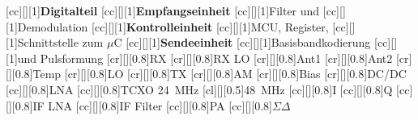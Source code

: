 [cc][][1]{\Large\textbf{Digitalteil}}
[cc][][1]{\textbf{Empfangseinheit}}
[cc][][1]{Filter und}
[cc][][1]{Demodulation}
[cc][][1]{\textbf{Kontrolleinheit}}
[cc][][1]{MCU, Register,}
[cc][][1]{Schnittstelle zum $\mu$C}
[cc][][1]{\textbf{Sendeeinheit}}
[cc][][1]{Basisbandkodierung}
[cc][][1]{und Pulsformung}
[cr][][0.8]{RX}
[cr][][0.8]{RX LO}
[cr][][0.8]{Ant1}
[cr][][0.8]{Ant2}
[cr][][0.8]{Temp}
[cr][][0.8]{LO}
[cr][][0.8]{TX}
[cr][][0.8]{AM}
[cr][][0.8]{Bias}
[cr][][0.8]{DC/DC}
[cc][][0.8]{LNA}
[cc][][0.8]{TCXO \SI{24}{\mega\hertz}}
[cl][][0.5]{\SI{48}{\mega\hertz}}
[cc][][0.8]{I}
[cc][][0.8]{Q}
[cc][][0.8]{IF LNA}
[cc][][0.8]{IF Filter}
[cc][][0.8]{PA}
[cc][][0.8]{$\Sigma\Delta$}